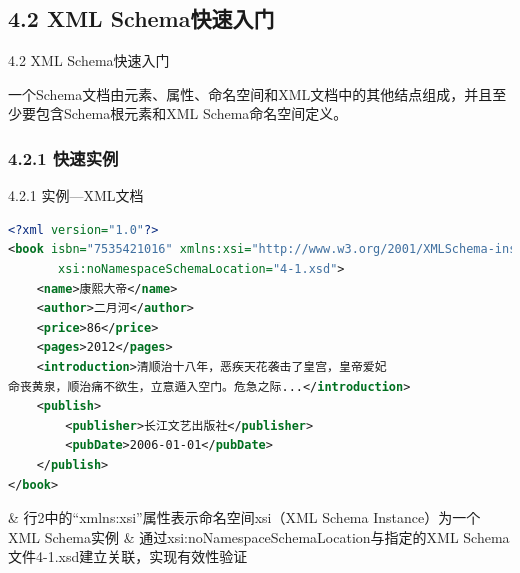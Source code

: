 \subsection{4.2 XML Schema快速入门}

\begin{frame}[fragile]{4.2 XML Schema快速入门}
\begin{shaded}
一个Schema文档由元素、属性、命名空间和XML文档中的其他结点组成，并且至少要包含Schema根元素和XML Schema命名空间定义。
\end{shaded}
\end{frame}


\subsubsection{4.2.1 快速实例}
\begin{frame}{4.2.1 实例—XML文档}
\begin{lstlisting}[tabsize=8, basicstyle=\small\tt, language=XML]
<?xml version="1.0"?>
<book isbn="7535421016" xmlns:xsi="http://www.w3.org/2001/XMLSchema-instance" 
       xsi:noNamespaceSchemaLocation="4-1.xsd">
    <name>康熙大帝</name>
    <author>二月河</author>
    <price>86</price>
    <pages>2012</pages>    
    <introduction>清顺治十八年，恶疾天花袭击了皇宫，皇帝爱妃
命丧黄泉，顺治痛不欲生，立意遁入空门。危急之际...</introduction>
    <publish>
        <publisher>长江文艺出版社</publisher>
        <pubDate>2006-01-01</pubDate>
    </publish>    
</book>
\end{lstlisting}
\begin{easylist} \easyitem
& 行2中的“xmlns:xsi”属性表示命名空间xsi（XML Schema Instance）为一个XML Schema实例
& 通过xsi:noNamespaceSchemaLocation与指定的XML Schema文件4-1.xsd建立关联，实现有效性验证
\end{easylist}
\end{frame}

